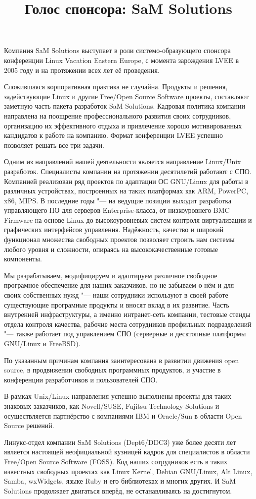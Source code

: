 \documentclass[10pt, a5paper]{article}
\begin{document}
\title{Голос спонсора: SaM Solutions}
\date{}
\maketitle

Компания SaM Solutions выступает в роли системо-образующего спонсора конференции Linux Vacation Eastern Europe, с момента зарождения LVEE в 2005 году и на протяжении всех лет её проведения. 

Сложившаяся корпоративная практика не случайна. Продукты и решения, задействующие Linux и другие Free/Open Source Software проекты, составляют заметную часть пакета разработок SaM Solutions. Кадровая политика компании направлена на поощрение профессионального развития своих сотрудников, организацию их эффективного отдыха и привлечение хорошо мотивированных кандидатов к работе на компанию. Формат конференции LVEE успешно позволяет решать все три задачи. 

Одним из направлений нашей деятельности является направление Linux/Unix разработок. Специалисты компании на протяжении десятилетий работают с СПО. Компанией реализован ряд проектов по адаптации ОС GNU/Linux для работы в различных устройствах, построенных на таких платформах как ARM, PowerPC, x86, MIPS. В последние годы "--- на ведущие позиции выходит разработка управляющего ПО для серверов Enterprise-класса, от низкоуровнего BMC Firmware на основе Linux до высокоуровневых систем контроля виртуализации и графических интерфейсов управления. Надёжность, качество и широкий функционал множества свободных проектов позволяет строить нам системы любого уровня и сложности, опираясь на высококачественные готовые компоненты.

Мы разрабатываем, модифицируем и адаптируем различное свободное програмное обеспечение для наших заказчиков, но не забываем о нём и для своих собственных нужд "--- наши сотрудники используют в своей работе существующие програмные продукты и вносят вклад в их развитие. Часть внутренней инфраструктуры, а именно интранет-сеть компании, тестовые стенды отдела контроля качества, рабочие места сотрудников профильных подразделений "--- также работает под управлением СПО (серверные и десктопные платформы GNU/Linux и FreeBSD).

По указанным причинам компания заинтересована в развитии движения open source, в продвижении свободных программных продуктов, и участие в конференции разработчиков и пользователей СПО.

В рамках Unix/Linux направления успешно выполнены проекты для таких знаковых заказчиков, как  Novell/SUSE, Fujitsu Technology Solutions  и осуществляется партнёрство с компаниями IBM и \linebreak Oracle/Sun в области Open Source решений.

Линукс-отдел компании SaM Solutions (Dept6/DDC3) уже более десяти лет является настоящей неофициальной кузницей кадров для специалистов в области Free/Open Source Software (FOSS). Код наших сотрудников есть в таких известных свободных проектах как Linux Kernel, Debian GNU/Linux, Alt Linux, Samba, wxWidgets, языке Ruby и его библиотеках и многих других. И SaM Solutions продолжает двигаться вперёд, не останавливаясь на достигнутом.
\end{document}
